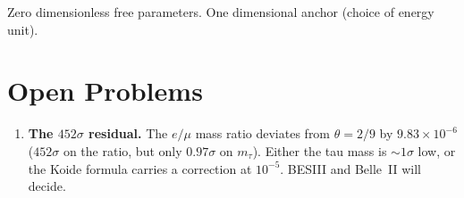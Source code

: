 \documentclass[11pt,a4paper]{article}
\theoremstyle{definition}
\theoremstyle{remark}
\begin{document}
\medskip

Zero dimensionless free parameters. One dimensional anchor (choice of energy unit).

\section*{Open Problems}

\begin{enumerate}[nosep]
\item \textbf{The $452\sigma$ residual.} The $e/\mu$ mass ratio deviates from $\theta=2/9$ by $9.83\times 10^{-6}$ ($452\sigma$ on the ratio, but only $0.97\sigma$ on $m_\tau$). Either the tau mass is ${\sim}1\sigma$ low, or the Koide formula carries a correction at $10^{-5}$. BESIII and Belle~II will decide.
\end{enumerate}
\end{document}
